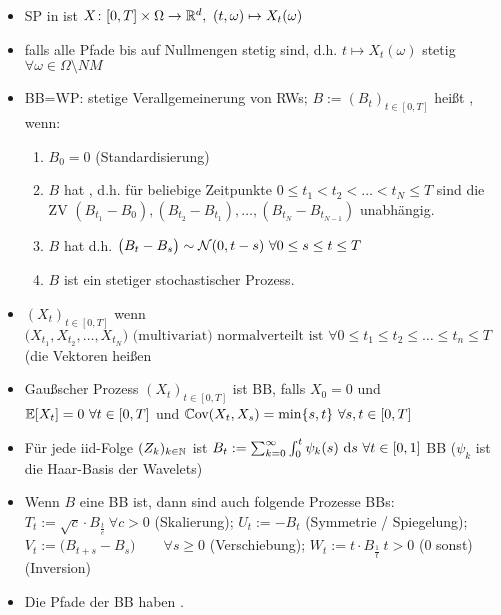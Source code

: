 \documentclass[12pt]{scrartcl}
\begin{document}
	\begin{itemize}
		\item SP in  ist $X\colon[0,T]\times\Omega\to\mathbb{R}^d,~(t,\omega)\mapsto X_t(\omega)$
		\item {} falls alle Pfade bis auf Nullmengen stetig sind, d.h. $t\mapsto X_t(\omega)$ stetig $\forall\omega\in\Omega\setminus NM$
		\item BB=WP: stetige Verallgemeinerung von RWs; $B:=(B_t)_{t\in[0,T]}$ heißt , wenn:
		\begin{enumerate}
			\item $B_0=0$ (Standardisierung)
			\item $B$ hat , d.h. für beliebige Zeitpunkte $0\leq t_1<t_2<\ldots<t_N\leq T$ sind die ZV 
			$\left(B_{t_1}-B_0\right),\left(B_{t_2}-B_{t_1}\right),\ldots,\left(B_{t_N}-B_{t_{N-1}}\right)$ unabhängig.
			\item $B$ hat  d.h.
		 $\big(B_t-B_s\big)\sim\mathcal{N}(0,t-s)~\forall 0\leq s\leq t\leq T$
			\item $B$ ist ein stetiger stochastischer Prozess.
		\end{enumerate}
		\item $(X_t)_{t\in[0,T]}$  wenn $ \Big(X_{t_1},X_{t_2},\ldots,X_{t_N}\Big)\text{ (multivariat) normalverteilt ist }\forall0\leq t_1\leq t_2\leq\ldots\leq t_n\leq T $ (die Vektoren heißen  
		\item Gaußscher Prozess $(X_t)_{t\in[0,T]}$ ist BB, falls $X_0=0$ und $\mathbb{E}[X_t]=0~\forall t\in[0,T]$ und $\mathbb{C}\text{ov}(X_t,X_s)=\min\lbrace s,t\rbrace~\forall s,t\in[0,T]$
		\item Für jede iid-Folge $(Z_k)_{k\in\mathbb{N}}$ ist $B_t:=\sum_{k=0}^\infty\int_0^t\psi_k(s)~\mathrm{d} s~\forall t\in[0,1]$ BB ($\psi_k$ ist die Haar-Basis der Wavelets)
		\item Wenn $B$ eine BB ist, dann sind auch folgende Prozesse BBs:
		$T_t:=\sqrt{c}\cdot B_{\frac{t}{c}}~\forall c>0$ (Skalierung); 
		$U_t:=-B_t$ (Symmetrie / Spiegelung);
		$V_t:=\big(B_{t+s}-B_s\big)\qquad\forall s\geq0$ (Verschiebung);
		$W_t:=t\cdot B_{\frac{1}{t}}~t>0$ (0 sonst) (Inversion)
		\item Die Pfade der BB haben .
	\end{itemize}
\end{document}

